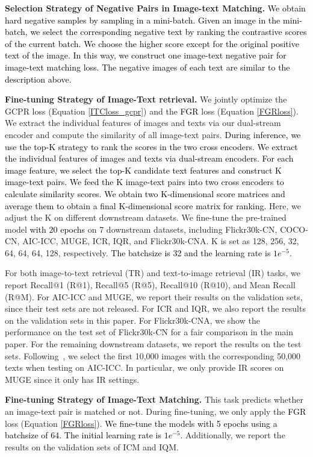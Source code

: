 \documentclass[sigconf]{acmart}
\def\jc{\textcolor{black}}
\def\blue{\textcolor{black}}
\def\mmljc{\textcolor{black}}
\def\mmcr{\textcolor{black}}
\begin{document}
\textbf{Selection Strategy of Negative Pairs in Image-text Matching.}
\blue{We obtain hard negative samples by sampling in a mini-batch. Given an image in the mini-batch, we select the corresponding negative text by ranking the contrastive scores of the current batch. We choose the higher score except for the original positive text of the image. In this way, we construct one image-text negative pair for \mmljc{image-text matching} loss. The negative images of each text are similar to the description above.}

\textbf{Fine-tuning Strategy of Image-Text retrieval.}
We jointly optimize the GCPR loss (Equation \ref{ITCloss_gcpr}) and the \mmcr{FGR} loss (Equation \ref{FGRloss}). 
We extract the individual features of images and texts via our dual-stream encoder and
compute the similarity of all image-text pairs. 
\mmcr{During inference, we use the top-K strategy to rank the scores in the two cross encoders. We extract the individual features of images and texts via dual-stream encoders. For each image feature, we select the top-K candidate text features and construct K image-text pairs. We feed the K image-text pairs into two cross encoders to calculate similarity scores. We obtain two K-dimensional score matrices and average them to obtain a final K-dimensional score matrix for ranking.}
Here, we adjust the K on different downstream datasets.
We fine-tune the pre-trained model \jc{with 20 epochs} on 7 downstream datasets, including Flickr30k-CN, COCO-CN, AIC-ICC, MUGE, ICR, IQR, and Flickr30k-CNA.
K is set as 128, 256, 32, 64, 64, 64, 128, respectively. \jc{The batchsize is 32 and the learning rate is $1e^{-5}$.}

For both image-to-text retrieval (TR) and text-to-image retrieval (IR) tasks, we report Recall@1 (R@1), Recall@5 (R@5), Recall@10 (R@10), and Mean Recall (R@M).
For AIC-ICC and MUGE, we report their results on the validation sets, since their test sets are not released. For ICR and IQR, we also report the results on the validation sets in this paper.
For Flickr30k-CNA, we show the performance on the test set of Flickr30k-CN for a fair comparison in the main paper. 
For the remaining downstream datasets, we report the results on the test sets. Following~\cite{gu2022wukong}, we select the first 10,000 images with the corresponding 50,000 texts when testing on AIC-ICC. In particular, we only provide IR scores on MUGE since it only has IR settings.

\textbf{Fine-tuning Strategy of Image-Text Matching.}
This task predicts whether an image-text pair is matched or not. 
During fine-tuning, we only apply the \mmcr{FGR} loss (Equation \ref{FGRloss}). \jc{We fine-tune the models with 5 epochs using a batchsize of 64. The initial learning rate is $1e^{-5}$.}
Additionally, we report the results on the validation sets of ICM and IQM.
\end{document}
